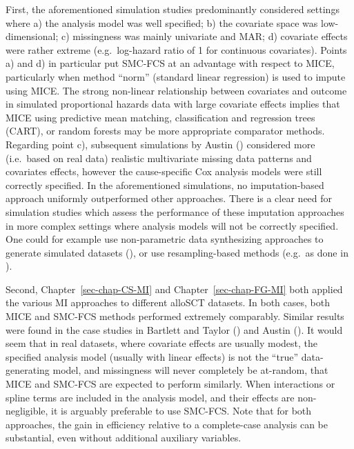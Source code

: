 \documentclass[
  letterpaper,
  paper=240mm:170mm,
  twoside=true,
  open=right,
  fontsize=10pt,
  pagesize=false,
  BCOR=15mm,
  DIV=14,
  headinclude=true,
  footinclude=false,
  headsepline=on]{scrbook}
\begin{document}
First, the aforementioned simulation studies predominantly considered
settings where a) the analysis model was well specified; b) the
covariate space was low-dimensional; c) missingness was mainly
univariate and MAR; d) covariate effects were rather extreme
(e.g.~log-hazard ratio of 1 for continuous covariates). Points a) and d)
in particular put SMC-FCS at an advantage with respect to MICE,
particularly when method ``norm'' (standard linear regression) is used
to impute using MICE. The strong non-linear relationship between
covariates and outcome in simulated proportional hazards data with large
covariate effects implies that MICE using predictive mean matching,
classification and regression trees (CART), or random forests may be
more appropriate comparator methods. Regarding point c), subsequent
simulations by Austin
() considered
more (i.e.~based on real data) realistic multivariate missing data
patterns and covariates effects, however the cause-specific Cox analysis
models were still correctly specified. In the aforementioned
simulations, no imputation-based approach uniformly outperformed other
approaches. There is a clear need for simulation studies which assess
the performance of these imputation approaches in more complex settings
where analysis models will not be correctly specified. One could for
example use non-parametric data synthesizing approaches to generate
simulated datasets
(), or use resampling-based methods (e.g.~as done in
).

Second, Chapter~\ref{sec-chap-CS-MI} and Chapter~\ref{sec-chap-FG-MI}
both applied the various MI approaches to different alloSCT datasets. In
both cases, both MICE and SMC-FCS methods performed extremely
comparably. Similar results were found in the case studies in Bartlett
and Taylor ()
and Austin ().
It would seem that in real datasets, where covariate effects are usually
modest, the specified analysis model (usually with linear effects) is
not the ``true'' data-generating model, and missingness will never
completely be at-random, that MICE and SMC-FCS are expected to perform
similarly. When interactions or spline terms are included in the
analysis model, and their effects are non-negligible, it is arguably
preferable to use SMC-FCS. Note that for both approaches, the gain in
efficiency relative to a complete-case analysis can be substantial, even
without additional auxiliary variables.
\end{document}

